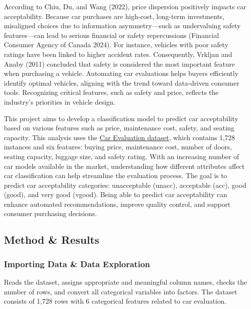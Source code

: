 \documentclass[
  letterpaper,
  DIV=11,
  numbers=noendperiod]{scrartcl}
\begin{document}
According to Chiu, Du, and Wang (2022), price dispersion positively
impacts car acceptability. Because car purchases are high-cost,
long-term investments, misaligned choices due to information
asymmetry---such as undervaluing safety features---can lead to serious
financial or safety repercussions (Financial Consumer Agency of Canada
2024). For instance, vehicles with poor safety ratings have been linked
to higher accident rates. Consequently, Vrkljan and Anaby (2011)
concluded that safety is considered the most important feature when
purchasing a vehicle. Automating car evaluations helps buyers
efficiently identify optimal vehicles, aligning with the trend toward
data-driven consumer tools. Recognizing critical features, such as
safety and price, reflects the industry's priorities in vehicle design.

This project aims to develop a classification model to predict car
acceptability based on various features such as price, maintenance cost,
safety, and seating capacity. This analysis uses the
\href{https://archive.ics.uci.edu/dataset/19/car+evaluation}{Car
Evaluation dataset}, which contains 1,728 instances and six features:
buying price, maintenance cost, number of doors, seating capacity,
luggage size, and safety rating. With an increasing number of car models
available in the market, understanding how different attributes affect
car classification can help streamline the evaluation process. The goal
is to predict car acceptability categories: unacceptable (unacc),
acceptable (acc), good (good), and very good (vgood). Being able to
predict car acceptability can enhance automated recommendations, improve
quality control, and support consumer purchasing decisions.

\subsection{Method \& Results}\label{method-results}

\subsubsection{Importing Data \& Data
Exploration}\label{importing-data-data-exploration}

Reads the dataset, assigns appropriate and meaningful column names,
checks the number of rows, and convert all categorical variables into
factors. The dataset consists of 1,728 rows with 6 categorical features
related to car evaluation.
\end{document}
